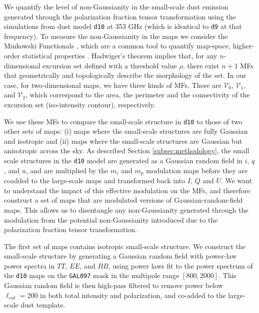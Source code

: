 \documentclass[twocolumn]{aastex631}
\begin{document}
We quantify the level of non-Gaussianity in the small-scale dust emission generated through the polarization fraction tensor transformation using the simulations from dust model \texttt{d10} at 353 GHz (which is identical to \texttt{d9} at that frequency). To measure the non-Gaussianity in the maps we consider the Minkowski Functionals \citep[MFs,][]{Minkowski1903}, which are a common tool to quantify map-space, higher-order statistical properties \citep{Martire:2023, Carones:2024}. 
Hadwiger’s theorem \citep{hadwigerVorlesungenUeberInhalt1957}
implies that, for any $n$-dimensional excursion set defined with a threshold value $\rho$, there exist $n+1$ MFs that geometrically and topologically describe the morphology of the set. In our case, for two-dimensional maps, we have three kinds of MFs. These are $\mathcal{V}_0$, $\mathcal{V}_1$, and $\mathcal{V}_2$, which correspond to the area, the perimeter and the connectivity of the excursion set (iso-intensity contour), respectively.

We use these MFs to compare the small-scale structure in \texttt{d10} to those of two other sets of maps: (i) maps where the small-scale structures are fully Gaussian and isotropic and (ii) maps where the small-scale structures are Gaussian but anisotropic across the sky. As described Section \ref{subsec:methodology}, the small scale structures in the \texttt{d10} model are generated as a Gaussian random field in $i$, $q$, and $u$, and are multiplied by the $m_i$ and $m_p$ modulation maps before they are coadded to the large-scale maps and transformed back into $I$, $Q$ and $U$. We want to understand the impact of this effective modulation on the MFs, and therefore construct a set of maps that are modulated versions of Gaussian-random-field maps. This allows us to disentangle any non-Gaussianity generated through the modulation from the potential non-Gaussianity introduced due to the polarization fraction tensor transformation.

The first set of maps contains isotropic small-scale structure. We construct the small-scale structure by generating a Gaussian random field with power-law power spectra in $TT$, $EE$, and $BB$, using power laws fit to the power spectrum of the \texttt{d10} maps on the \texttt{GAL097} mask in the multipole range $[800, 2000]$. This Gaussian random field is then high-pass filtered to remove power below $\ell_{cut} = 200$ in both total intensity and polarization, and co-added to the large-scale dust template.
\end{document}
